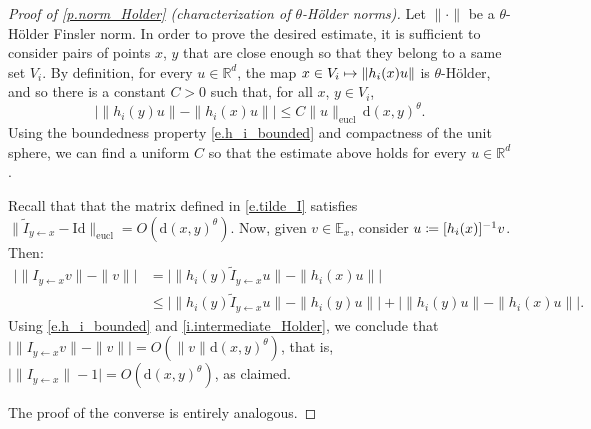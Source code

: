 \documentclass[10pt]{amsart}
\def\vcentcolon{\mathrel{\mathop\ordinarycolon}}
\providecommand\ordinarycolon{:}
\providecommand*\coloneqq{\vcentcolon\mathrel{\mkern-1.2mu}=}
\newcommand\mto{\mathchoice{\longmapsto}{\mapsto}{\mapsto}{\mapsto}}
\theoremstyle{plain}
\theoremstyle{definition}
\newcommand{\RR}{\mathbb{R}}
\newcommand{\EE}{\mathbb{E}}
\newcommand{\dd}{\mathrm{d}}
\begin{document}
\begin{proof}[Proof of \cref{p.norm_Holder} (characterization of $\theta$-Hölder norms)]
Let $\|\mathord{\cdot}\|$ be a $\theta$-Hölder Finsler norm.
In order to prove the desired estimate, it is sufficient to consider pairs of points $x$, $y$ that are close enough so that they belong to a same set $V_i$.
By definition, for every $u \in \RR^d$, the map $x \in V_i \mto \|h_i(x) u \|$ is $\theta$-Hölder, and so there is a constant $C > 0$ such that, for all $x$, $y \in V_i$,
\begin{equation}\label{i.intermediate_Holder}
\big| \| h_i(y) u \| - \| h_i(x) u \| \big| \le C \|u\|_\mathrm{eucl} \, \dd(x,y)^\theta.
\end{equation}
Using the boundedness property \eqref{e.h_i_bounded} and compactness of the unit sphere, we can find a uniform $C$ so that the estimate above holds for every $u \in \RR^d$.

Recall that that the matrix defined in \eqref{e.tilde_I} satisfies $\| \tilde I_{y \gets x} -\mathrm{Id}\|_\mathrm{eucl} = O(\dd(x,y)^\theta)$.
Now, given $v \in \EE_x$, consider $u \coloneqq [h_i(x)]^{-1} v$.
Then:
\begin{align*}
\big| \| I_{y \gets x} v\| - \| v \| \big|
&=
\big| \| h_i(y) \tilde I_{y \gets x} u \| - \| h_i(x) u \| \big| \\
&\le
\big| \| h_i(y) \tilde I_{y \gets x} u \| - \| h_i(y) u \| \big| +
\big| \| h_i(y) u\| - \| h_i(x) u \| \big|.
\end{align*}
Using \eqref{e.h_i_bounded} and \eqref{i.intermediate_Holder}, we conclude that $\big| \| I_{y \gets x} v\| - \| v \| \big| = O(\|v\| \dd(x,y)^\theta)$, that is, $\big| \| I_{y \gets x} \| - 1 \big| = O(\dd(x,y)^\theta)$, as claimed.

The proof of the converse is entirely analogous.
\end{proof}
\end{document}
